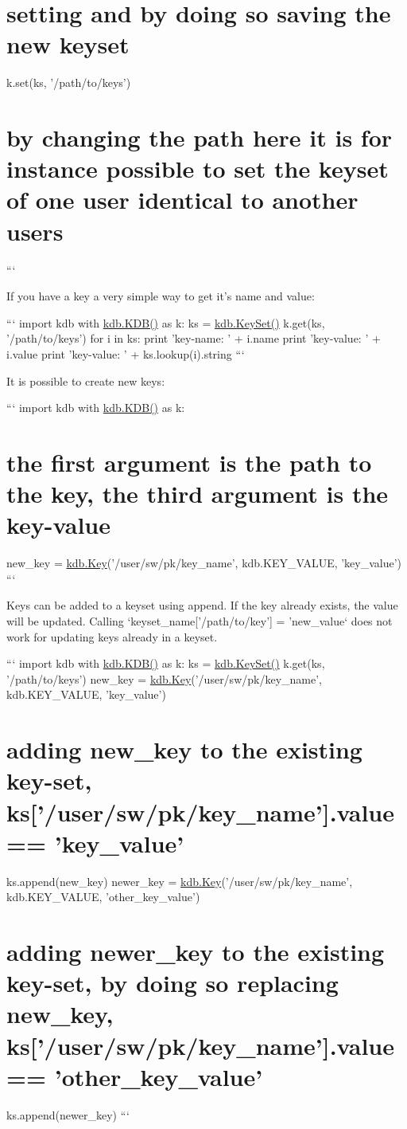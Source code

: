 \section*{setting and by doing so saving the new keyset}

k.\+set(ks, '/path/to/keys') \section*{by changing the path here it is for instance possible to set the keyset of one user identical to another users}

```

If you have a key a very simple way to get it's name and value\+:

``` import kdb with \hyperlink{classkdb_1_1KDB}{kdb.\+K\+D\+B()} as k\+: ks = \hyperlink{classkdb_1_1KeySet}{kdb.\+Key\+Set()} k.\+get(ks, '/path/to/keys') for i in ks\+: print 'key-\/name\+: ' + i.\+name print 'key-\/value\+: ' + i.\+value print 'key-\/value\+: ' + ks.\+lookup(i).string ```

It is possible to create new keys\+:

``` import kdb with \hyperlink{classkdb_1_1KDB}{kdb.\+K\+D\+B()} as k\+: \section*{the first argument is the path to the key, the third argument is the key-\/value}

new\+\_\+key = \hyperlink{classkdb_1_1Key}{kdb.\+Key}('/user/sw/pk/key\+\_\+name', kdb.\+K\+E\+Y\+\_\+\+V\+A\+L\+U\+E, 'key\+\_\+value') ```

Keys can be added to a keyset using {\ttfamily append}. If the key already exists, the value will be updated. Calling `keyset\+\_\+name\mbox{[}'/path/to/key'\mbox{]} = 'new\+\_\+value` does not work for updating keys already in a keyset.

``` import kdb with \hyperlink{classkdb_1_1KDB}{kdb.\+K\+D\+B()} as k\+: ks = \hyperlink{classkdb_1_1KeySet}{kdb.\+Key\+Set()} k.\+get(ks, '/path/to/keys') new\+\_\+key = \hyperlink{classkdb_1_1Key}{kdb.\+Key}('/user/sw/pk/key\+\_\+name', kdb.\+K\+E\+Y\+\_\+\+V\+A\+L\+U\+E, 'key\+\_\+value') \section*{adding new\+\_\+key to the existing key-\/set, ks\mbox{[}'/user/sw/pk/key\+\_\+name'\mbox{]}.value == 'key\+\_\+value'}

ks.\+append(new\+\_\+key) newer\+\_\+key = \hyperlink{classkdb_1_1Key}{kdb.\+Key}('/user/sw/pk/key\+\_\+name', kdb.\+K\+E\+Y\+\_\+\+V\+A\+L\+U\+E, 'other\+\_\+key\+\_\+value') \section*{adding newer\+\_\+key to the existing key-\/set, by doing so replacing new\+\_\+key, ks\mbox{[}'/user/sw/pk/key\+\_\+name'\mbox{]}.value == 'other\+\_\+key\+\_\+value'}

ks.\+append(newer\+\_\+key) ``` 